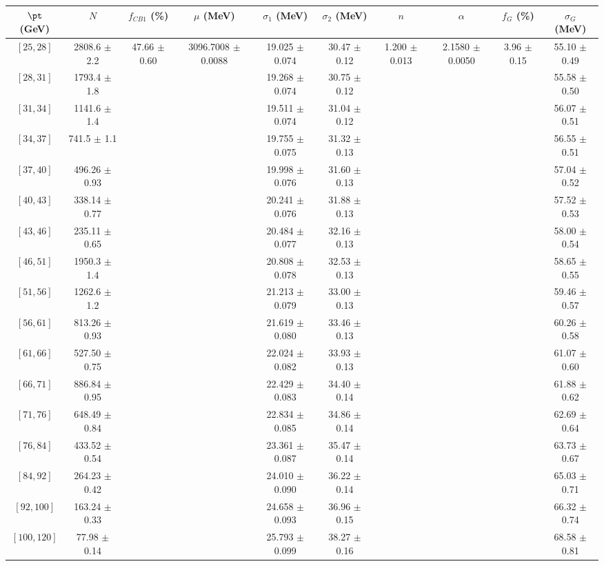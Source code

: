 \begin{tabular}{c||c|c|c|c|c|c|c|c|c}
$\pt$ (GeV) & $N$ & $f_{CB1}$ (\%)  & $\mu$ (MeV) & $\sigma_1$ (MeV) & $\sigma_2$ (MeV) & $n$ & $\alpha$ & $f_G$ (\%) & $\sigma_G$ (MeV) \\
\hline
$[25, 28]$ & 2808.6 $\pm$ 2.2 & \multirow{17}{*}{47.66 $\pm$ 0.60} & \multirow{17}{*}{3096.7008 $\pm$ 0.0088} & 19.025 $\pm$ 0.074 & 30.47 $\pm$ 0.12 & \multirow{17}{*}{1.200 $\pm$ 0.013} & \multirow{17}{*}{2.1580 $\pm$ 0.0050} & \multirow{17}{*}{3.96 $\pm$ 0.15} & 55.10 $\pm$ 0.49\\
$[28, 31]$ & 1793.4 $\pm$ 1.8 &  &  & 19.268 $\pm$ 0.074 & 30.75 $\pm$ 0.12 &  &  &  & 55.58 $\pm$ 0.50\\
$[31, 34]$ & 1141.6 $\pm$ 1.4 &  &  & 19.511 $\pm$ 0.074 & 31.04 $\pm$ 0.12 &  &  &  & 56.07 $\pm$ 0.51\\
$[34, 37]$ & 741.5 $\pm$ 1.1 &  &  & 19.755 $\pm$ 0.075 & 31.32 $\pm$ 0.13 &  &  &  & 56.55 $\pm$ 0.51\\
$[37, 40]$ & 496.26 $\pm$ 0.93 &  &  & 19.998 $\pm$ 0.076 & 31.60 $\pm$ 0.13 &  &  &  & 57.04 $\pm$ 0.52\\
$[40, 43]$ & 338.14 $\pm$ 0.77 &  &  & 20.241 $\pm$ 0.076 & 31.88 $\pm$ 0.13 &  &  &  & 57.52 $\pm$ 0.53\\
$[43, 46]$ & 235.11 $\pm$ 0.65 &  &  & 20.484 $\pm$ 0.077 & 32.16 $\pm$ 0.13 &  &  &  & 58.00 $\pm$ 0.54\\
$[46, 51]$ & 1950.3 $\pm$ 1.4 &  &  & 20.808 $\pm$ 0.078 & 32.53 $\pm$ 0.13 &  &  &  & 58.65 $\pm$ 0.55\\
$[51, 56]$ & 1262.6 $\pm$ 1.2 &  &  & 21.213 $\pm$ 0.079 & 33.00 $\pm$ 0.13 &  &  &  & 59.46 $\pm$ 0.57\\
$[56, 61]$ & 813.26 $\pm$ 0.93 &  &  & 21.619 $\pm$ 0.080 & 33.46 $\pm$ 0.13 &  &  &  & 60.26 $\pm$ 0.58\\
$[61, 66]$ & 527.50 $\pm$ 0.75 &  &  & 22.024 $\pm$ 0.082 & 33.93 $\pm$ 0.13 &  &  &  & 61.07 $\pm$ 0.60\\
$[66, 71]$ & 886.84 $\pm$ 0.95 &  &  & 22.429 $\pm$ 0.083 & 34.40 $\pm$ 0.14 &  &  &  & 61.88 $\pm$ 0.62\\
$[71, 76]$ & 648.49 $\pm$ 0.84 &  &  & 22.834 $\pm$ 0.085 & 34.86 $\pm$ 0.14 &  &  &  & 62.69 $\pm$ 0.64\\
$[76, 84]$ & 433.52 $\pm$ 0.54 &  &  & 23.361 $\pm$ 0.087 & 35.47 $\pm$ 0.14 &  &  &  & 63.73 $\pm$ 0.67\\
$[84, 92]$ & 264.23 $\pm$ 0.42 &  &  & 24.010 $\pm$ 0.090 & 36.22 $\pm$ 0.14 &  &  &  & 65.03 $\pm$ 0.71\\
$[92, 100]$ & 163.24 $\pm$ 0.33 &  &  & 24.658 $\pm$ 0.093 & 36.96 $\pm$ 0.15 &  &  &  & 66.32 $\pm$ 0.74\\
$[100, 120]$ & 77.98 $\pm$ 0.14 &  &  & 25.793 $\pm$ 0.099 & 38.27 $\pm$ 0.16 &  &  &  & 68.58 $\pm$ 0.81\\
\end{tabular}

